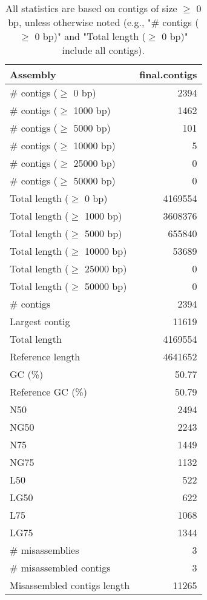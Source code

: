 \documentclass[12pt,a4paper]{article}
\begin{document}
\begin{table}[ht]
\begin{center}
\caption{All statistics are based on contigs of size $\geq$ 0 bp, unless otherwise noted (e.g., "\# contigs ($\geq$ 0 bp)" and "Total length ($\geq$ 0 bp)" include all contigs).}
\begin{tabular}{|l*{1}{|r}|}
\hline
Assembly & final.contigs \\ \hline
\# contigs ($\geq$ 0 bp) & 2394 \\ \hline
\# contigs ($\geq$ 1000 bp) & 1462 \\ \hline
\# contigs ($\geq$ 5000 bp) & 101 \\ \hline
\# contigs ($\geq$ 10000 bp) & 5 \\ \hline
\# contigs ($\geq$ 25000 bp) & 0 \\ \hline
\# contigs ($\geq$ 50000 bp) & 0 \\ \hline
Total length ($\geq$ 0 bp) & 4169554 \\ \hline
Total length ($\geq$ 1000 bp) & 3608376 \\ \hline
Total length ($\geq$ 5000 bp) & 655840 \\ \hline
Total length ($\geq$ 10000 bp) & 53689 \\ \hline
Total length ($\geq$ 25000 bp) & 0 \\ \hline
Total length ($\geq$ 50000 bp) & 0 \\ \hline
\# contigs & 2394 \\ \hline
Largest contig & 11619 \\ \hline
Total length & 4169554 \\ \hline
Reference length & 4641652 \\ \hline
GC (\%) & 50.77 \\ \hline
Reference GC (\%) & 50.79 \\ \hline
N50 & 2494 \\ \hline
NG50 & 2243 \\ \hline
N75 & 1449 \\ \hline
NG75 & 1132 \\ \hline
L50 & 522 \\ \hline
LG50 & 622 \\ \hline
L75 & 1068 \\ \hline
LG75 & 1344 \\ \hline
\# misassemblies & 3 \\ \hline
\# misassembled contigs & 3 \\ \hline
Misassembled contigs length & 11265 \\ \hline

\end{tabular}
\end{center}
\end{table}
\end{document}

